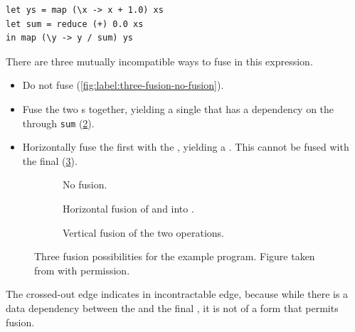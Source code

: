 \begin{lstlisting}
let ys = map (\x -> x + 1.0) xs
let sum = reduce (+) 0.0 xs
in map (\y -> y / sum) ys
\end{lstlisting}

There are three mutually incompatible ways to fuse in this expression.

\begin{itemize}
\item Do not fuse (\cref{fig:label:three-fusion-no-fusion}).
\item Fuse the two s together, yielding a single  that
  has a dependency on the  through \texttt{sum}
  (\cref{fig:three-fusion-map-map}).
\item Horizontally fuse the first  with the ,
  yielding a .  This  cannot be fused with the
  final  (\cref{fig:three-fusion-map-reduce}).
\end{itemize}

\begin{figure}
  \centering

  \begin{subfigure}[t]{0.32\textwidth}
      
      \caption{No fusion.}
      \label{fig:three-fusion-no-fusion}
  \end{subfigure}
  \begin{subfigure}[t]{0.32\textwidth}
    
    \caption{Horizontal fusion of  and  into .}
      \label{fig:three-fusion-map-map}
  \end{subfigure}
  \begin{subfigure}[t]{0.32\textwidth}
    
    \caption{Vertical fusion of the two  operations.}
      \label{fig:three-fusion-map-reduce}
  \end{subfigure}


  \caption{Three fusion possibilities for the example program. Figure
    taken from \cite{dybdal2017array} with permission.}
  \label{fig:three-fusion-opportunities}
\end{figure}

The crossed-out edge indicates in incontractable edge, because while
there is a data dependency between the  and the final
, it is not of a form that permits fusion.

